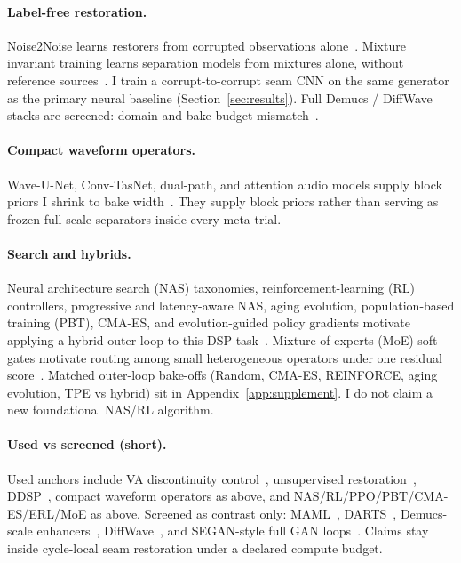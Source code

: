 \paragraph{Label-free restoration.}
Noise2Noise learns restorers from corrupted observations alone~\cite{lehtinen2018,kashyap2021n2n}.
Mixture invariant training learns separation models from mixtures alone, without reference sources~\cite{wisdom2020}.
I train a corrupt-to-corrupt seam CNN on the same generator as the primary neural baseline (Section~\ref{sec:results}).
Full Demucs / DiffWave stacks are screened: domain and bake-budget mismatch~\cite{dfossez2019,kong2021}.

\paragraph{Compact waveform operators.}
Wave-U-Net, Conv-TasNet, dual-path, and attention audio models supply block priors I shrink to bake width~\cite{stoller2018,macartney2018,jansson2017,luo2019,luo2020dprnn,subakan2021,gong2021ast,ronneberger2015,he2016resnet,vaswani2017}.
They supply block priors rather than serving as frozen full-scale separators inside every meta trial.

\paragraph{Search and hybrids.}
Neural architecture search (NAS) taxonomies, reinforcement-learning (RL) controllers, progressive and latency-aware NAS, aging evolution, population-based training (PBT), CMA-ES, and evolution-guided policy gradients motivate applying a hybrid outer loop to this DSP task~\cite{elsken2019,zoph2017nas,pham2018,liu2018pnas,tan2019mnasnet,real2019,jaderberg2017,hansen2016cmaes,khadka2018,schulman2017}.
Mixture-of-experts (MoE) soft gates motivate routing among small heterogeneous operators under one residual score~\cite{shazeer2017}.
Matched outer-loop bake-offs (Random, CMA-ES, REINFORCE, aging evolution, TPE vs hybrid) sit in Appendix~\ref{app:supplement}.
I do not claim a new foundational NAS/RL algorithm.

\paragraph{Used vs screened (short).}
Used anchors include VA discontinuity control~\cite{stilson1996,esqueda2016blamp,valimaki2007polyblep}, unsupervised restoration~\cite{lehtinen2018,kashyap2021n2n,wisdom2020}, DDSP~\cite{engel2020}, compact waveform operators as above, and NAS/RL/PPO/PBT/CMA-ES/ERL/MoE as above.
Screened as contrast only: MAML~\cite{finn2017}, DARTS~\cite{liu2019}, Demucs-scale enhancers~\cite{dfossez2019,dfossez2020,dfossez2021}, DiffWave~\cite{kong2021}, and SEGAN-style full GAN loops~\cite{pascual2017}.
Claims stay inside cycle-local seam restoration under a declared compute budget.
